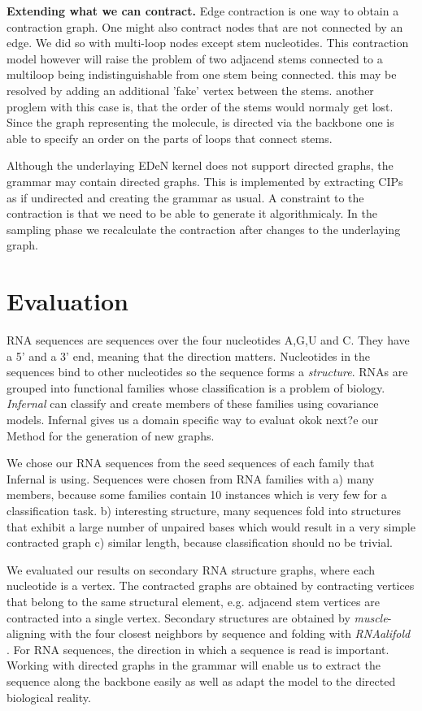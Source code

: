 \documentclass{article}
\begin{document}
\textbf{Extending what we can contract.}
Edge contraction is one way to obtain a contraction graph. 
One might also contract nodes that are not connected by an edge.
We did so with multi-loop nodes except stem nucleotides.
This contraction model however will raise the problem 
of two adjacend stems connected to a multiloop being
indistinguishable from one stem being connected.
this may be resolved by adding an additional 'fake' vertex 
between the stems. another proglem with 
this case is, that the order of the stems would normaly get lost.
Since the graph representing the molecule, is directed via 
the backbone one is able to specify an order on the
parts of loops that connect stems.

Although the underlaying EDeN kernel does not support directed graphs,
the grammar may contain directed graphs. This is implemented by extracting
CIPs as if undirected and creating the grammar as usual.
A constraint to the contraction is that we need to be able to 
generate it algorithmicaly. In the sampling phase we recalculate 
the contraction after changes to the underlaying graph.


\section{Evaluation}
RNA sequences are sequences over the four nucleotides A,G,U and C.
They have a 5' and a 3' end, meaning that the direction matters.
Nucleotides in the sequences bind to other nucleotides so
the sequence forms a \emph{structure}.
RNAs are grouped into functional families whose classification
is a problem of biology. \emph{Infernal}\cite{infernal} can classify and 
create members of these families using covariance models.
Infernal gives us a domain specific way to evaluat
okok next?e
our Method for the generation of new graphs. 

We chose our RNA sequences from the seed sequences of each family
that Infernal is using\cite{rfam}. Sequences were chosen from RNA families with
a) many members, because some families contain 10
instances which is very few for a classification task. b) interesting 
structure, many sequences fold into structures that exhibit a large number of 
unpaired bases which would result in a very simple contracted graph
c) similar length, because classification should no be trivial.

We evaluated our results on secondary RNA structure graphs, where each 
nucleotide is a vertex. The contracted graphs are obtained by 
contracting vertices that belong to the same structural element,
e.g. adjacend stem vertices are contracted into a single vertex.
Secondary structures are obtained by \emph{muscle}-aligning \cite{muscle} with 
the four closest neighbors by sequence and folding with \emph{RNAalifold}
\cite{rnaalifold}.  For RNA sequences, the direction in which a sequence
is read is important.  Working with directed graphs in the grammar
will enable us to extract the sequence along the backbone easily as well
as adapt the model to the directed biological reality.
\end{document}
